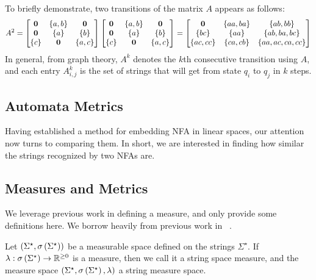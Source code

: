 \begin{example}
  To briefly demonstrate, two transitions of the matrix \(A\) appears as
  follows:
  \begin{align*}
    A^2 =
      \begin{bmatrix}
        \mathbf{0} & \left\{a, b\right\} & \mathbf{0} \\
        \mathbf{0} & \left\{a\right\} & \left\{b\right\} \\
        \left\{c\right\} & \mathbf{0} & \left\{a, c\right\}
      \end{bmatrix} 
      \begin{bmatrix}
        \mathbf{0} & \left\{a, b\right\} & \mathbf{0} \\
        \mathbf{0} & \left\{a\right\} & \left\{b\right\} \\
        \left\{c\right\} & \mathbf{0} & \left\{a, c\right\}
      \end{bmatrix}
      =
      \begin{bmatrix}
        \mathbf{0} & \left\{aa, ba\right\} & \left\{ab, bb\right\} \\
        \left\{bc\right\} & \left\{aa\right\} & \left\{ab, ba, bc\right\} \\
        \left\{ac, cc\right\} & \left\{ca, cb\right\} & \left\{aa, ac, ca, cc\right\}
      \end{bmatrix}
  \end{align*}
  In general, from graph theory, \(A^k\) denotes the \(k\)th consecutive
  transition using \(A\),
  and each entry \(A^k _{i, j}\) is the set of strings that will
  get from state \(q_i\) to \(q_j\) in \(k\) steps.

\end{example}


\subsection{Automata Metrics}

Having established a method for embedding NFA in linear spaces,
our attention now turns to comparing them.
In short, we are interested in finding how similar the strings
recognized by two NFAs are.

\subsection{Measures and Metrics}
We leverage previous work in defining a measure,
and only provide some definitions here.
We borrow heavily from previous work in ~\cite{xue2018langmeasures}.

\begin{definition}
  Let
  \(\left(\Sigma^\star, \sigma\left(\Sigma^\star\right)\right)\)
  be a measurable space defined on the strings \(\Sigma^\star\).
  If \(\lambda : \sigma\left(\Sigma^\star\right) \to \mathbb{R}^{\geq 0}\) is a measure,
  then we call it a string space measure,
  and the measure space
  \(\left(\Sigma^\star, \sigma\left(\Sigma^\star\right), \lambda\right)\)
  a string measure space.
\end{definition}

